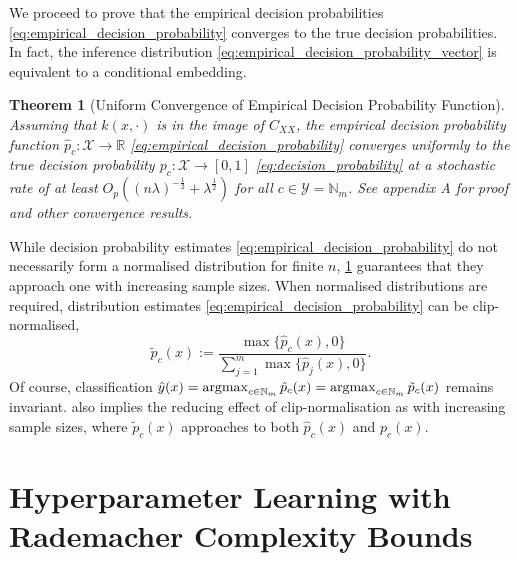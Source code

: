 \documentclass{article}
\newtheorem{theorem}{Theorem}[section]
\newcommand{\argmax}{\operatornamewithlimits{argmax}}
\begin{document}
	We proceed to prove that the empirical decision probabilities \eqref{eq:empirical_decision_probability} converges to the true decision probabilities. In fact, the inference distribution \eqref{eq:empirical_decision_probability_vector} is equivalent to a conditional embedding.
	\begin{theorem}[Uniform Convergence of Empirical Decision Probability Function]
		\label{thm:probability_convergence_copy}
		Assuming that $k(x, \cdot)$ is in the image of $C_{XX}$, the empirical decision probability function $\hat{p}_{c} : \mathcal{X} \to \mathbb{R}$ \eqref{eq:empirical_decision_probability} converges uniformly to the true decision probability $p_{c} : \mathcal{X} \to [0, 1]$ \eqref{eq:decision_probability} at a stochastic rate of at least $O_{p}((n \lambda)^{-\frac{1}{2}} + \lambda^{\frac{1}{2}})$ for all $c \in \mathcal{Y} = \mathbb{N}_{m}$. See appendix A for proof and other convergence results.
	\end{theorem}
	While decision probability estimates \eqref{eq:empirical_decision_probability} do not necessarily form a normalised distribution for finite $n$, \cref{thm:probability_convergence_copy} guarantees that they approach one with increasing sample sizes. When normalised distributions are required, distribution estimates \eqref{eq:empirical_decision_probability} can be clip-normalised,
	\begin{equation}
		\tilde{p}_{c}(x) := \frac{\max\{\hat{p}_{c}(x), 0\}}{\sum_{j = 1}^{m} \max\{\hat{p}_{j}(x), 0\}}.
	\label{eq:empirical_decision_probability_clip_normalised}
	\end{equation}
	Of course, classification $\hat{y}(x) = \argmax_{c \in \mathbb{N}_{m}} \hat{p}_{c}(x) = \argmax_{c \in \mathbb{N}_{m}} \tilde{p}_{c}(x)$ remains invariant.   also implies the reducing effect of clip-normalisation as with increasing sample sizes, where $\tilde{p}_{c}(x)$ approaches to both $\hat{p}_{c}(x)$ and $p_{c}(x)$.
	
\section{Hyperparameter Learning with Rademacher Complexity Bounds}
\label{sec:hyperparameter_learning}
\end{document}

